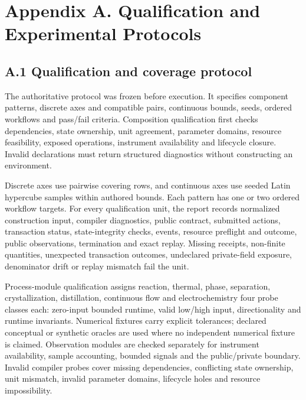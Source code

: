 \documentclass[10pt,twocolumn]{article}
\begin{document}
\clearpage


\clearpage

\section{Appendix A. Qualification and Experimental
Protocols}\label{appendix-a.-qualification-and-experimental-protocols}

\subsection{A.1 Qualification and coverage
protocol}\label{a.1-qualification-and-coverage-protocol}

The authoritative protocol was frozen before execution. It specifies
component patterns, discrete axes and compatible pairs, continuous
bounds, seeds, ordered workflows and pass/fail criteria. Composition
qualification first checks dependencies, state ownership, unit
agreement, parameter domains, resource feasibility, exposed operations,
instrument availability and lifecycle closure. Invalid declarations must
return structured diagnostics without constructing an environment.

Discrete axes use pairwise covering rows, and continuous axes use seeded
Latin hypercube samples within authored bounds. Each pattern has one or
two ordered workflow targets. For every qualification unit, the report
records normalized construction input, compiler diagnostics, public
contract, submitted actions, transaction status, state-integrity checks,
events, resource preflight and outcome, public observations, termination
and exact replay. Missing receipts, non-finite quantities, unexpected
transaction outcomes, undeclared private-field exposure, denominator
drift or replay mismatch fail the unit.

Process-module qualification assigns reaction, thermal, phase,
separation, crystallization, distillation, continuous flow and
electrochemistry four probe classes each: zero-input bounded runtime,
valid low/high input, directionality and runtime invariants. Numerical
fixtures carry explicit tolerances; declared conceptual or synthetic
oracles are used where no independent numerical fixture is claimed.
Observation modules are checked separately for instrument availability,
sample accounting, bounded signals and the public/private boundary.
Invalid compiler probes cover missing dependencies, conflicting state
ownership, unit mismatch, invalid parameter domains, lifecycle holes and
resource impossibility.
\end{document}
